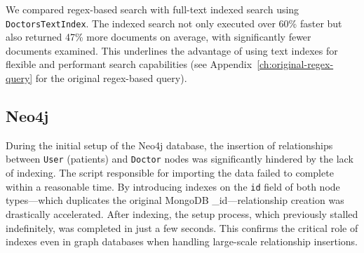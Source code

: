 We compared regex-based search with full-text indexed search using \texttt{DoctorsTextIndex}. The indexed search not only executed over 60\% faster but also returned 47\% more documents on average, with significantly fewer documents examined. This underlines the advantage of using text indexes for flexible and performant search capabilities (see Appendix~\ref{ch:original-regex-query} for the original regex-based query).

\subsection{Neo4j}
During the initial setup of the Neo4j database, the insertion of relationships between \texttt{User} (patients) and \texttt{Doctor} nodes was significantly hindered by the lack of indexing. The script responsible for importing the data failed to complete within a reasonable time. By introducing indexes on the \texttt{id} field of both node types—which duplicates the original MongoDB \_id—relationship creation was drastically accelerated. After indexing, the setup process, which previously stalled indefinitely, was completed in just a few seconds. This confirms the critical role of indexes even in graph databases when handling large-scale relationship insertions.

